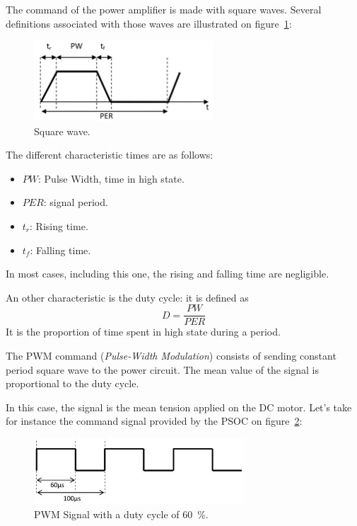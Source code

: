 \documentclass[11pt,a4paper]{article}
\theoremstyle{definition}%
\begin{document}
The command of the power amplifier is made with square waves.
Several definitions associated with those waves are illustrated on figure~\ref{fig:square-wave}:
\begin{figure}[H]
\center
\includegraphics[width=0.6\textwidth]{square-wave}
\caption{Square wave.}
\label{fig:square-wave}
\end{figure}

The different characteristic times are as follows:
\begin{itemize}
	\item $PW$: Pulse Width, time in high state.
	\item $PER$: signal period.
	\item $t_r$: Rising time.
	\item $t_f$: Falling time.
\end{itemize}

In most cases, including this one, the rising and falling time are negligible.

An other characteristic is the duty cycle: it is defined as \[D = \frac{PW}{PER}\]
It is the proportion of time spent in high state during a period.

The PWM command (\textit{Pulse-Width Modulation}) consists of sending constant period square wave to the power circuit.
The mean value of the signal is proportional to the duty cycle.

In this case, the signal is the mean tension applied on the DC motor.
Let's take for instance the command signal provided by the PSOC on figure~\ref{fig:pwm}:
\begin{figure}[H]
\center
\includegraphics[width=0.7\textwidth]{pwm}
\caption{PWM Signal with a duty cycle of 60~\%.}
\label{fig:pwm}
\end{figure}
\end{document}

